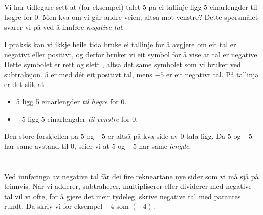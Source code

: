 




\section{\negintro}
Vi har tidlegare sett at (for eksempel) talet 5 på ei tallinje ligg 5 einarlengder til høgre for 0. 
Men kva om vi går andre veien, altså mot venstre? Dette spørsmålet svarer vi på ved å innføre \textit{negative tal}.\regv

\vsk 
I praksis kan vi ikkje heile tida bruke ei tallinje for å avgjere om eit tal er negativt eller positivt, og derfor bruker vi eit symbol for å vise at tal er negative. Dette symbolet er rett og slett \sym{$ - $}, altså det same symbolet som vi bruker ved subtraksjon. $ 5 $ er med dét eit positivt tal, mens $ -5 $ er eit negativt tal. På tallinja er det slik at
\begin{itemize}
	\item 5 ligg 5 einarlengder \textsl{til høgre} for 0.
	\item $ -5 $ ligg 5 einarlengder \textsl{til venstre} for 0.
\end{itemize}
Den store forskjellen på $ 5 $ og $ -5 $ er altså på kva side av 0 tala ligg. Da $ 5 $ og $ -5 $ har same avstand til 0, seier vi at $ 5 $ og $ -5 $ har same \textit{lengde}. \regv

\eks[1]{ \vs \vs
\[ |27|=27 \]
}
\eks[2]{ \vs \vs
\[ |-27|=27 \]
}
\newpage
\section{\negrekn \label{rekmneg}}
Ved innføringa av negative tal får dei fire rekneartane nye sider som vi må sjå på trinnvis. Når vi adderer, subtraherer, multipliserer eller dividerer med negative tal vil vi ofte, for å gjere det meir tydeleg, skrive negative tal med parantes rundt. Da skriv vi for eksempel $ -4 $ som $ (-4) $. 

